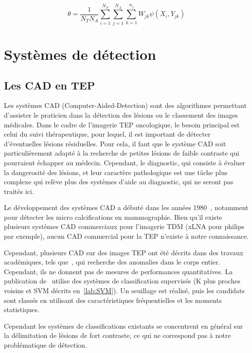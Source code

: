 \begin{equation}
\label{eq:JAFROC2}
\theta=\frac{1}{N_T N_A} \sum_{i=1}^{N_N} \sum_{j=1}^{N_A} \sum_{k=1}^{n_j} W_{jk} \psi(X_i, Y_{jk})
\end{equation}


\chapter{Systèmes de détection}

	\section{Les CAD en TEP}

Les systèmes CAD (Computer-Aided-Detection) sont des algorithmes permettant d'assister le praticien dans la détection des lésions ou le classement des images médicales. Dans le cadre de l'imagerie TEP oncologique, le besoin principal est celui du suivi thérapeutique, pour lequel, il est important de détecter d'éventuelles lésions résiduelles. Pour cela, il faut que le système CAD soit particulièrement adapté à la recherche de petites lésions de faible contraste qui pourraient échapper au médecin. Cependant, le diagnostic, qui consiste à évaluer la dangerosité des lésions, et leur caractère pathologique est une tâche plus complexe qui relève plus des systèmes d'aide au diagnostic, qui ne seront pas traités ici.

Le développement des systèmes CAD a débuté dans les années 1980~\cite{chan1987image}, notamment pour détecter les micro calcifications en mammographie. Bien qu'il existe plusieurs systèmes CAD commerciaux pour l'imagerie TDM (xLNA pour philips par exemple), aucun CAD commercial pour la TEP n'existe à notre connaissance.

Cependant, plusieurs CAD sur des images TEP ont été décrits dans des travaux académiques, tels que~\cite{guan2006automatic}, qui recherche des anomalies dans le corps entier. Cependant, ils ne donnent pas de mesures de performances quantitatives. La publication de~\cite{Kanakatte2008pulmonary} utilise des systèmes de classification supervisés (K plus proches voisins et SVM décrits en~\ref{lab:SVM}). Un seuillage est réalisé, puis les candidats sont classés en utilisant des caractéristiques fréquentielles et les moments statistiques. 


Cependant les systèmes de classifications existants se concentrent en général sur la délimitation de lésions de fort contraste, ce qui ne correspond pas à notre problématique de détection. 

